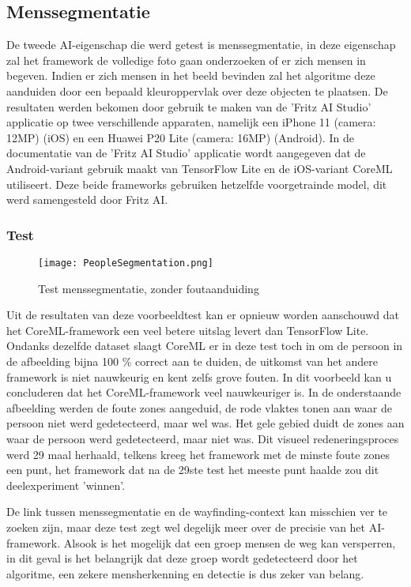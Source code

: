 \subsection{Menssegmentatie}
De tweede AI-eigenschap die werd getest is menssegmentatie, in deze eigenschap zal het framework de volledige foto gaan onderzoeken of er zich mensen in begeven. Indien er zich mensen in het beeld bevinden zal het algoritme deze aanduiden door een bepaald kleuroppervlak over deze objecten te plaatsen. De resultaten werden bekomen door gebruik te maken van de 'Fritz AI Studio' applicatie op twee verschillende apparaten, namelijk een iPhone 11 (camera: 12MP) (iOS) en een Huawei P20 Lite (camera: 16MP) (Android). In de documentatie van de 'Fritz AI Studio' applicatie wordt aangegeven dat de Android-variant gebruik maakt van TensorFlow Lite en de iOS-variant CoreML utiliseert. Deze beide frameworks gebruiken hetzelfde voorgetrainde model, dit werd samengesteld door Fritz AI.

\newpage
\subsubsection{Test}

\begin{figure}[H]
	\centering
	\texttt{[image: PeopleSegmentation.png]}
	\caption{Test menssegmentatie, zonder foutaanduiding}
\end{figure}
Uit de resultaten van deze voorbeeldtest kan er opnieuw worden aanschouwd dat het CoreML-framework een veel betere uitslag levert dan TensorFlow Lite. Ondanks dezelfde dataset slaagt CoreML er in deze test toch in om de persoon in de afbeelding bijna 100 \% correct aan te duiden, de uitkomst van het andere framework is niet nauwkeurig en kent zelfs grove fouten. In dit voorbeeld kan u concluderen dat het CoreML-framework veel nauwkeuriger is. In de onderstaande afbeelding werden de foute zones aangeduid, de rode vlaktes tonen aan waar de persoon niet werd gedetecteerd, maar wel was. Het gele gebied duidt de zones aan waar de persoon werd gedetecteerd, maar niet was. Dit visueel redeneringsproces werd 29 maal herhaald, telkens kreeg het framework met de minste foute zones een punt, het framework dat na de 29ste test het meeste punt haalde zou dit deelexperiment 'winnen'.

 De link tussen menssegmentatie en de wayfinding-context kan misschien ver te zoeken zijn, maar deze test zegt wel degelijk meer over de precisie van het AI-framework. Alsook is het mogelijk dat een groep mensen de weg kan versperren, in dit geval is het belangrijk dat deze groep wordt gedetecteerd door het algoritme, een zekere mensherkenning en detectie is dus zeker van belang.

